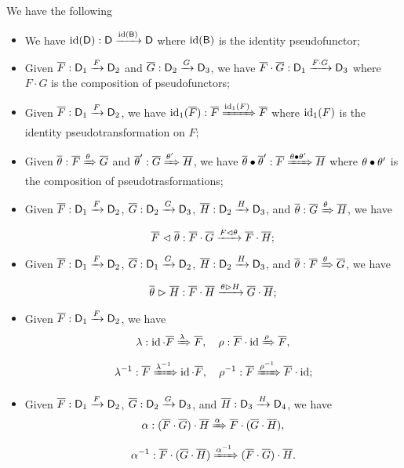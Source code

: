 \begin{example}
We have the following
\begin{itemize}
	\item We have $\id(\D) : \disppsfun{\D}{\D}{\id(\B)}$
	where $\id(\B)$ is the identity pseudofunctor;
	\item Given $\FF : \disppsfun{\D_1}{\D_2}{F}$ and $\GG : \disppsfun{\D_2}{\D_3}{G}$,
	we have $\FF \cdot \GG : \disppsfun{\D_1}{\D_3}{F \cdot G}$
	where $F \cdot G$ is the composition of pseudofunctors;
	\item Given $\FF : \disppsfun{\D_1}{\D_2}{F}$,
	we have $\id_1(\FF) : \disppstrans{\FF}{\FF}{\id_1(F)}$
	where $\id_1(F)$ is the identity pseudotransformation on $F$;
	\item Given $\thetatheta : \disppstrans{\FF}{\GG}{\theta}$ and $\thetatheta' : \disppstrans{\GG}{\HH}{\theta'}$,
	we have $\thetatheta \vcomp \thetatheta' : \disppstrans{\FF}{\HH}{\theta \vcomp \theta'}$
	where $\theta \vcomp \theta'$ is the composition of pseudotrasformations;
	\item Given $\FF : \disppsfun{\D_1}{\D_2}{F}$, $\GG : \disppsfun{\D_2}{\D_3}{G}$, $\HH : \disppsfun{\D_2}{\D_3}{H}$, and $\thetatheta : \disppstrans{\GG}{\HH}{\theta}$,
	we have
	\[
	\FF \whiskerl \thetatheta : \disppsfun{\FF \cdot \GG}{\FF \cdot \HH}{F \whiskerl \theta};
	\]
	\item Given $\FF : \disppsfun{\D_1}{\D_2}{F}$, $\GG : \disppsfun{\D_1}{\D_2}{G}$, $\HH : \disppsfun{\D_2}{\D_3}{H}$, and $\thetatheta : \disppstrans{\FF}{\GG}{\theta}$,
	we have
	\[
	\thetatheta \whiskerr \HH : \disppsfun{\FF \cdot \HH}{\GG \cdot \HH}{\theta \whiskerr H};
	\]
	\item Given $\FF : \disppsfun{\D_1}{\D_2}{F}$,
	we have
	\[
	\lunitor{\FF} : \disppstrans{\id \cdot \FF}{\FF}{\lunitor{F}}, \quad
	\runitor{\FF} : \disppstrans{\FF \cdot \id}{\FF}{\runitor{\FF}},
 	\]
	\[
	\linvunitor{\FF} : \disppstrans{\FF}{\id \cdot \FF}{\linvunitor{F}}, \quad
	\rinvunitor{\FF} : \disppstrans{\FF}{\FF \cdot \id}{\rinvunitor{\FF}};
	\]
	\item Given $\FF : \disppsfun{\D_1}{\D_2}{F}$, $\GG : \disppsfun{\D_2}{\D_3}{G}$, and $\HH : \disppsfun{\D_3}{\D_4}{H}$,
	we have
	\[
	\lassoc{\FF}{\GG}{\HH} : \disppstrans{(\FF \cdot \GG) \cdot \HH}{\FF \cdot (\GG \cdot \HH)}{\lassoc{F}{G}{H}},
	\]
	\[
	\rassoc{\FF}{\GG}{\HH} : \disppstrans{\FF \cdot (\GG \cdot \HH)}{(\FF \cdot \GG) \cdot \HH}{\rassoc{F}{G}{H}}.
	\]
\end{itemize}
\end{example}

